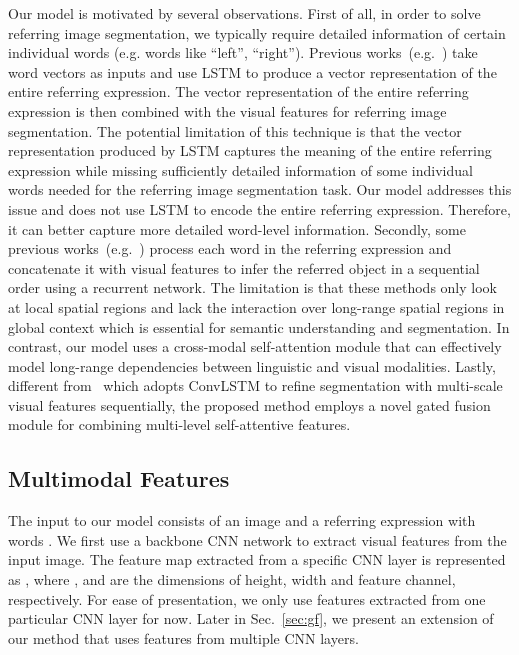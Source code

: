 \documentclass[10pt,twocolumn,letterpaper]{article}
\begin{document}
Our model is motivated by several observations. First of all, in order to solve referring image segmentation, we typically require detailed information of certain individual words (e.g. words like ``left'', ``right''). Previous works~(e.g.~\cite{hu2016segmentation,li2018referring,shi2018key}) take word vectors as inputs and use LSTM to produce a vector representation of the entire referring expression. The vector representation of the entire  referring expression is then combined with the visual features for referring image segmentation. The potential limitation of this technique is that the vector representation produced by LSTM captures the meaning of the entire referring expression while missing sufficiently detailed information of some individual words needed for the referring image segmentation task. Our model addresses this issue and does not use LSTM to encode the entire referring expression. Therefore, it can better capture more detailed word-level information. Secondly, some previous works~(e.g.~\cite{liu2017recurrent,margffoy2018dynamic}) process each word in the referring expression and concatenate it with visual features to infer the referred object in a sequential order using a recurrent network. The limitation is that these methods only look at local spatial regions and lack the interaction over long-range spatial regions in global context which is essential for semantic understanding and segmentation. In contrast, our model uses a cross-modal self-attention module that can effectively model long-range dependencies between linguistic and visual modalities. Lastly, different from~\cite{li2018referring} which adopts ConvLSTM to refine segmentation with multi-scale visual features sequentially, the proposed method employs a novel gated fusion module for combining multi-level self-attentive features.

\subsection{Multimodal Features}
The input to our model consists of an image  and a referring expression with  words . We first use a backbone CNN network to extract visual features from the input image. The feature map extracted from a specific CNN layer is represented as , where ,  and  are the dimensions of height, width and feature channel, respectively. For ease of presentation, we only use features extracted from one particular CNN layer for now. Later in Sec.~\ref{sec:gf}, we present an extension of our method that uses features from multiple CNN layers. 
\end{document}
